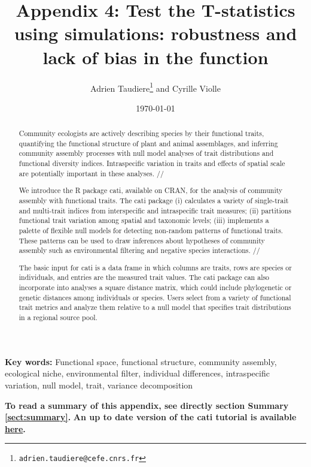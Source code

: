 \documentclass[12pt]{article}\usepackage[]{graphicx}\usepackage[]{color}
\title{Appendix 4: Test the T-statistics using simulations: robustness and lack of bias in the function}
\author{Adrien Taudiere\thanks{\texttt{adrien.taudiere@cefe.cnrs.fr}} and Cyrille Violle}
\affil{{\footnotesize CEFE - Centre d'Ecologie Fonctionnelle et Evolutive, Montpellier: France}}
\date{\today}
\begin{document}




\maketitle

\begin{abstract}
  Community ecologists are actively describing species by their functional traits, quantifying the functional structure of plant and animal assemblages, and inferring community assembly processes with null model analyses of trait distributions and functional diversity indices. Intraspecific variation in traits and effects of spatial scale are potentially important in these analyses.
//

	We introduce the R package cati, available on CRAN, for the analysis of community assembly with functional traits. The cati package (i) calculates a variety of single-trait and multi-trait indices from interspecific and intraspecific trait measures; (ii) partitions functional trait variation among spatial and taxonomic levels; (iii) implements a palette of flexible null models for detecting non-random patterns of functional traits. These patterns can be used to draw inferences about hypotheses of community assembly such as environmental filtering and negative species interactions.
//

The basic input for cati is a data frame in which columns are traits, rows are species or individuals, and entries are the measured trait values. The cati package can also incorporate into analyses a square distance matrix, which could include phylogenetic or genetic distances among individuals or species. Users select from a variety of functional trait metrics and analyze them relative to a null model that specifies trait distributions in a regional source pool.

\end{abstract}


\textbf{Key words:}
Functional space, functional structure, community assembly, ecological niche, environmental filter,
individual differences, intraspecific variation, null model, trait, variance decomposition


\vfill
\begin{center}
\textbf{To read a summary of this appendix, see directly section Summary \ref{sect:summary}.}
\textbf{An up to date version of the cati tutorial is available \href{https://github.com/adrientaudiere/cati/blob/Package-cati/Documentation/vignette_Darwin_finches/vignette.pdf}{here}.}
\end{center}
\end{document}
